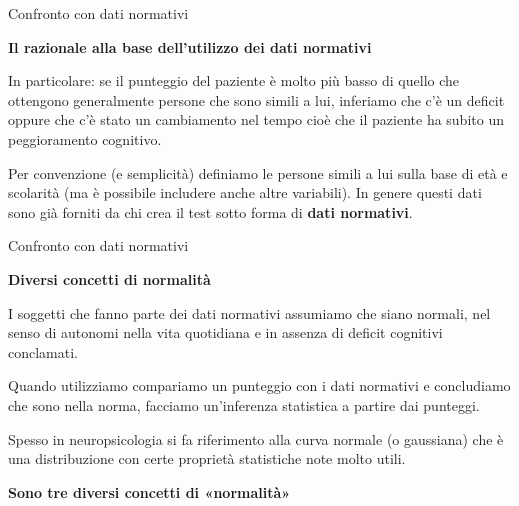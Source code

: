 \documentclass[
  ignorenonframetext,
  aspectratio=169,
]{beamer}
\begin{document}
\begin{frame}{Confronto con dati normativi}
\label{confronto-con-dati-normativi-7}
\begin{center}
  \textbf{Il razionale alla base dell’utilizzo dei dati normativi}
\end{center}

In particolare: se il punteggio del paziente è molto più basso di quello
che ottengono generalmente persone che sono simili a lui, inferiamo che
c'è un deficit oppure che c'è stato un cambiamento nel tempo cioè che il
paziente ha subito un peggioramento cognitivo.

Per convenzione (e semplicità) definiamo le persone simili a lui sulla
base di età e scolarità (ma è possibile includere anche altre
variabili). In genere questi dati sono già forniti da chi crea il test
sotto forma di \textbf{dati normativi}.
\end{frame}

\begin{frame}{Confronto con dati normativi}
\label{confronto-con-dati-normativi-8}
\begin{center}
  \textbf{Diversi concetti di normalità}
\end{center}

I soggetti che fanno parte dei dati normativi assumiamo che siano
normali, nel senso di autonomi nella vita quotidiana e in assenza di
deficit cognitivi conclamati.

Quando utilizziamo compariamo un punteggio con i dati normativi e
concludiamo che sono nella norma, facciamo un'inferenza statistica a
partire dai punteggi.

Spesso in neuropsicologia si fa riferimento alla curva normale (o
gaussiana) che è una distribuzione con certe proprietà statistiche note
molto utili.

\begin{center}
  \textbf{Sono tre diversi concetti di «normalità»}
\end{center}
\end{frame}
\end{document}
